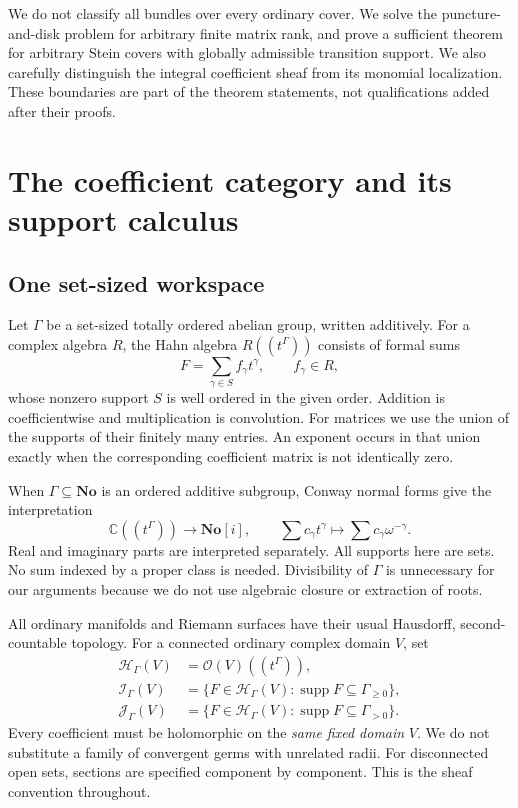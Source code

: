 \documentclass[11pt,letterpaper]{article}
\theoremstyle{definition}
\theoremstyle{remark}
\newcommand{\C}{\mathbb C}
\newcommand{\No}{\mathbf{No}}
\newcommand{\OO}{\mathcal O}
\newcommand{\HH}{\mathscr H_\Gamma}
\newcommand{\II}{\mathscr I_\Gamma}
\newcommand{\JJ}{\mathscr J_\Gamma}
\newcommand{\supp}{\operatorname{supp}}
\numberwithin{equation}{section}
\begin{document}
We do not classify all bundles over every ordinary cover. We solve the puncture-and-disk problem for arbitrary finite matrix rank, and prove a sufficient theorem for arbitrary Stein covers with globally admissible transition support. We also carefully distinguish the integral coefficient sheaf from its monomial localization. These boundaries are part of the theorem statements, not qualifications added after their proofs.

\section{The coefficient category and its support calculus}\label{sec:coefficients}

\subsection{One set-sized workspace}

Let $\Gamma$ be a set-sized totally ordered abelian group, written additively. For a complex algebra $R$, the Hahn algebra $R((t^\Gamma))$ consists of formal sums
\[
 F=\sum_{\gamma\in S}f_\gamma t^\gamma,
 \qquad f_\gamma\in R,
\]
whose nonzero support $S$ is well ordered in the given order. Addition is coefficientwise and multiplication is convolution. For matrices we use the union of the supports of their finitely many entries. An exponent occurs in that union exactly when the corresponding coefficient matrix is not identically zero.

When $\Gamma\subseteq\No$ is an ordered additive subgroup, Conway normal forms give the interpretation
\begin{equation}\label{eq:surrealembedding}
 \C((t^\Gamma))\longrightarrow\No[i],
 \qquad \sum c_\gamma t^\gamma\longmapsto
 \sum c_\gamma\omega^{-\gamma}.
\end{equation}
Real and imaginary parts are interpreted separately. All supports here are sets. No sum indexed by a proper class is needed. Divisibility of $\Gamma$ is unnecessary for our arguments because we do not use algebraic closure or extraction of roots.

All ordinary manifolds and Riemann surfaces have their usual Hausdorff, second-countable topology. For a connected ordinary complex domain $V$, set
\begin{align}
 \HH(V)&=\OO(V)((t^\Gamma)),\label{eq:H}\\
 \II(V)&=\{F\in\HH(V):\supp F\subseteq\Gamma_{\geq0}\},\label{eq:I}\\
 \JJ(V)&=\{F\in\HH(V):\supp F\subseteq\Gamma_{>0}\}.\label{eq:J}
\end{align}
Every coefficient must be holomorphic on the \emph{same fixed domain} $V$. We do not substitute a family of convergent germs with unrelated radii. For disconnected open sets, sections are specified component by component. This is the sheaf convention throughout.
\end{document}
